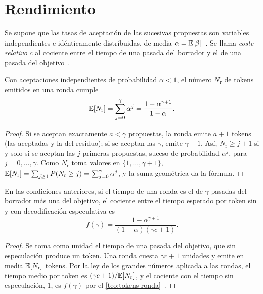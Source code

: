 \section{Rendimiento}

\begin{definicion}
Se supone que las tasas de aceptación de las sucesivas propuestas son variables independientes e idénticamente distribuidas, de media $\alpha=\mathbb{E}[\beta]$~\cite[§3.1]{leviathan}. Se llama \emph{coste relativo} $c$ al cociente entre el tiempo de una pasada del borrador y el de una pasada del objetivo~\cite[definición~3.7]{leviathan}.
\end{definicion}

\begin{teorema}\label{teo:tokens-ronda}
Con aceptaciones independientes de probabilidad $\alpha<1$, el número $N_{\mathrm{r}}$ de tokens emitidos en una ronda cumple
\[
\mathbb{E}[N_{\mathrm{r}}]=\sum_{j=0}^{\gamma}\alpha^{j}=\frac{1-\alpha^{\gamma+1}}{1-\alpha}.
\]
\end{teorema}

\begin{proof}
Si se aceptan exactamente $a<\gamma$ propuestas, la ronda emite $a+1$ tokens (las aceptadas y la del residuo); si se aceptan las $\gamma$, emite $\gamma+1$. Así, $N_{\mathrm{r}}\ge j+1$ si y solo si se aceptan las $j$ primeras propuestas, suceso de probabilidad $\alpha^{j}$, para $j=0,\dots,\gamma$. Como $N_{\mathrm{r}}$ toma valores en $\{1,\dots,\gamma+1\}$, $\mathbb{E}[N_{\mathrm{r}}]=\sum_{j\ge 1}P(N_{\mathrm{r}}\ge j)=\sum_{j=0}^{\gamma}\alpha^{j}$, y la suma geométrica da la fórmula.
\end{proof}

\begin{teorema}\label{teo:mejora}
En las condiciones anteriores, si el tiempo de una ronda es el de $\gamma$ pasadas del borrador más una del objetivo, el cociente entre el tiempo esperado por token sin y con decodificación especulativa es
\[
f(\gamma)=\frac{1-\alpha^{\gamma+1}}{(1-\alpha)(\gamma c+1)}.
\]
\end{teorema}

\begin{proof}
Se toma como unidad el tiempo de una pasada del objetivo, que sin especulación produce un token. Una ronda cuesta $\gamma c+1$ unidades y emite en media $\mathbb{E}[N_{\mathrm{r}}]$ tokens. Por la ley de los grandes números aplicada a las rondas, el tiempo medio por token es $(\gamma c+1)/\mathbb{E}[N_{\mathrm{r}}]$, y el cociente con el tiempo sin especulación, $1$, es $f(\gamma)$ por el \cref{teo:tokens-ronda}~\cite[teorema~3.8]{leviathan}.
\end{proof}

